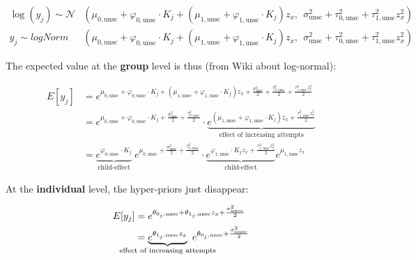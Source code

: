 \documentclass[11pt,a4paper]{article}
\begin{document}
\begin{linenomath}
\begin{align*}
\log(y_j) \sim 
	\mathcal{N}&(\mu_{0,\text{unsc}} + \varphi_{0,\text{unsc}} \cdot K_j + (\mu_{1,\text{unsc}} + \varphi_{1,\text{unsc}} \cdot K_{j}) z_x , \ \ 
				\sigma^2_\text{unsc} + \tau^2_{0,\text{unsc}} + \tau^2_{1,\text{unsc}} z_x^2) \\
y_j \sim logNorm&(\mu_{0,\text{unsc}} + \varphi_{0,\text{unsc}} \cdot K_j + (\mu_{1,\text{unsc}} + \varphi_{1,\text{unsc}} \cdot K_{j}) z_x , \ \ 
				\sigma^2_\text{unsc} + \tau^2_{0,\text{unsc}} + \tau^2_{1,\text{unsc}} z_x^2)
\end{align*}
\end{linenomath}
The expected value at the \textbf{group} level is thus (from Wiki about log-normal):
\begin{linenomath}
\begin{align*}
E[y_j] &= 
	e^{\mu_{0,\text{unsc}} + \varphi_{0,\text{unsc}} \cdot K_j +
	  (\mu_{1,\text{unsc}} + \varphi_{1,\text{unsc}} \cdot K_{j}) z_x  +
       \frac{\sigma^2_\text{unsc}}{2} + \frac{\tau^2_{0,\text{unsc}}}{2} +
	   \frac{\tau^2_{1,\text{unsc}} z_x^2}{2}} \\
&=
	e^{\mu_{0,\text{unsc}} + \varphi_{0,\text{unsc}} \cdot K_j +
       \frac{\sigma^2_\text{unsc}}{2} + \frac{\tau^2_{0,\text{unsc}}}{2}} \cdot
    \underbrace{
	e^{(\mu_{1,\text{unsc}} + \varphi_{1,\text{unsc}} \cdot K_{j}) z_x  +
       \frac{\tau^2_{1,\text{unsc}} z_x^2}{2}}}_{\text{effect of increasing attempts}} \\
&=
	\underbrace{e^{\varphi_{0,\text{unsc}} \cdot K_j}}_{\text{child-effect}} \
	e^{\mu_{0,\text{unsc}} +
       \frac{\sigma^2_\text{unsc}}{2} + \frac{\tau^2_{0,\text{unsc}}}{2}} \cdot
    \underbrace{
   	e^{\varphi_{1,\text{unsc}} \cdot K_{j} z_x  + \frac{\tau^2_{1,\text{unsc}} z_x^2}{2}}}_{\text{child-effect}}
	e^{\mu_{1,\text{unsc}} z_x}
\end{align*}
\end{linenomath}
At the \textbf{individual} level, the hyper-priors just disappear:
\begin{linenomath}
\begin{align*}
E[y_j] &= 
	e^{\theta_{0_j,\text{unsc}} + \theta_{1_j,\text{unsc}} z_x +
	     \frac{\sigma^2_\text{unsc}}{2}} \\
&=
	\underbrace{e^{\theta_{1_j,\text{unsc}} z_x}}_{\mathclap{\text{effect of increasing attempts}}} \
	e^{\theta_{0_j,\text{unsc}} +
	     \frac{\sigma^2_\text{unsc}}{2}}
\end{align*}
\end{linenomath}
\end{document}
